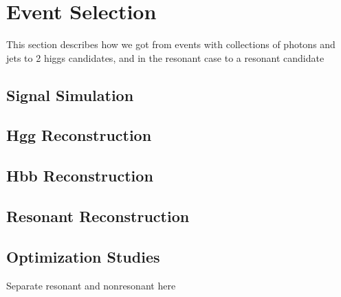 \chapter{Event Selection\label{ch:selection}}

This section describes how we got from events with collections of photons and jets to 2 higgs candidates, and in the resonant case to a resonant candidate

\section{Signal Simulation\label{sec:signalsim}}

\section{Hgg Reconstruction\label{sec:hggreconstruction}}

\section{Hbb Reconstruction\label{sec:hbbreconstruction}}

\section{Resonant Reconstruction\label{sec:Xreconstruction}}

\section{Optimization Studies\label{sec:optim}}
Separate resonant and nonresonant here


